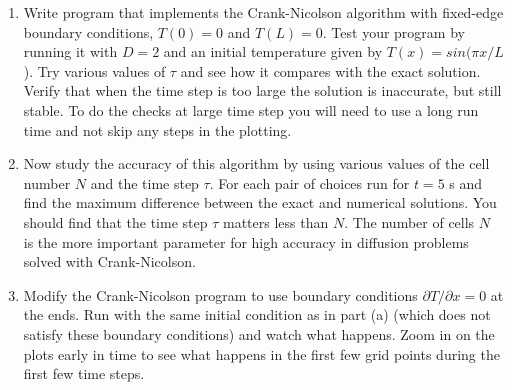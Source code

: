 \begin{problem}\label{P7.3}
\begin{enumerate}[label=(\alph*)]
\item Write program that implements the Crank-Nicolson algorithm with
fixed-edge boundary conditions, $T(0) = 0$ and $T(L) = 0$. Test your
program by running it with $D = 2$ and an initial temperature given
by $T (x) = sin(\pi x/L$). Try various values of $\tau$ and see how it compares
with the exact solution. Verify that when the time step is too large the
solution is inaccurate, but still stable. To do the checks at large time
step you will need to use a long run time and not skip any steps in the
plotting.
\item  Now study the accuracy of this algorithm by using various values of
the cell number $N$ and the time step $\tau$. For each pair of choices run
for $t = 5$ s and find the maximum difference between the exact and
numerical solutions. You should find that the time step $\tau$ matters less
than $N$. The number of cells $N$ is the more important parameter for
high accuracy in diffusion problems solved with Crank-Nicolson.

\item Modify the Crank-Nicolson program to use boundary conditions
$ \partial T /\partial x = 0$ at the ends. Run with the same initial condition as in
part (a) (which does not satisfy these boundary conditions) and watch
what happens. Zoom in on the plots early in time to see what happens
in the first few grid points during the first few time steps.
\end{enumerate}
\end{problem}